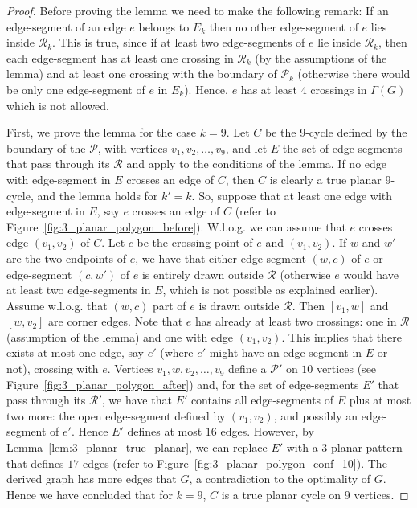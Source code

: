 \begin{proof}
Before proving the lemma we need to make the following remark: If an edge-segment of an edge $e$ belongs to $E_k$ then no other edge-segment of $e$ lies inside $\mathcal{R}_k$. This is true, since if at least two edge-segments of $e$ lie inside $\mathcal{R}_k$, then each edge-segment has at least one crossing in $\mathcal{R}_k$ (by the assumptions of the lemma) and at least one crossing with the boundary of $\mathcal{P}_k$ (otherwise there would be only one edge-segment of $e$ in $E_k$). Hence, $e$ has at least $4$ crossings in $\Gamma(G)$ which is not allowed. 
 
First, we prove the lemma for the case $k=9$. Let $C$ be the $9$-cycle defined by the boundary of the \pp $\mathcal{P}$, with vertices $v_1,v_2,\dots,v_9$, and let $E$ the set of edge-segments that pass through its \pr $\mathcal{R}$ and apply to the conditions of the lemma. If no edge with edge-segment in $E$ crosses an edge of $C$,  then $C$ is clearly a true planar $9$-cycle, and the lemma holds for $k'=k$. So, suppose that at least one edge with edge-segment in $E$, say $e$ crosses an edge of $C$ (refer to Figure~\ref{fig:3_planar_polygon_before}). W.l.o.g. we can assume that $e$ crosses edge $(v_1,v_2)$ of $C$. Let $c$ be the crossing point of $e$ and $(v_1,v_2)$. If $w$ and $w'$ are the two endpoints of $e$, we have that either edge-segment $(w,c)$ of $e$ or edge-segment $(c,w')$ of $e$ is entirely drawn outside $\mathcal{R}$ (otherwise $e$ would have at least two edge-segments in $E$, which is not possible as explained earlier). Assume w.l.o.g. that  $(w,c)$ part of $e$ is drawn outside $\mathcal{R}$. Then \pes $[v_1,w]$ and $[w,v_2]$ are corner edges. Note that $e$ has already at least two crossings: one in $\mathcal{R}$ (assumption of the lemma) and one with edge $(v_1,v_2)$. This implies that there exists at most one edge, say $e'$ (where $e'$ might have an edge-segment in $E$ or not), crossing with $e$. Vertices $v_1,w,v_2,\dots,v_9$ define a \pp $\mathcal{P}'$ on $10$ vertices (see Figure~\ref{fig:3_planar_polygon_after}) and, for the set of edge-segments $E'$ that pass through its \pr $\mathcal{R}'$, we have that $E'$ contains all edge-segments of $E$ plus at most two more: the open edge-segment defined by $(v_1,v_2)$, and possibly an edge-segment of $e'$. Hence $E'$ defines at most  $16$ edges. However, by Lemma~\ref{lem:3_planar_true_planar}, we can replace $E'$ with a $3$-planar pattern that defines $17$ edges (refer to Figure~\ref{fig:3_planar_polygon_conf_10}). The derived graph has more edges that $G$, a contradiction to the optimality of $G$. Hence we have concluded that for $k=9$, $C$ is a true planar cycle on $9$ vertices.


\end{proof}
